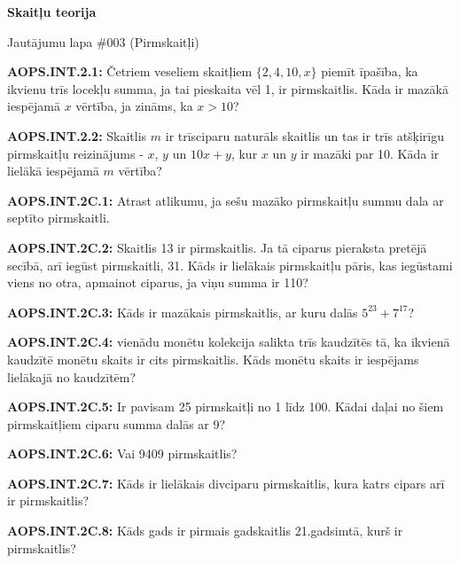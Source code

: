 \documentclass[11pt]{article}
\newenvironment{uzdevums}[1][\unskip]{%
\vspace{3mm}
\noindent
\textbf{#1:}
\noindent}
{}
\begin{document}
\begin{center}
{\LARGE \bf Skaitļu teorija}
\end{center}

\begin{center}
{\large Jautājumu lapa \#003 (Pirmskaitļi)}
\end{center}


\begin{uzdevums}[AOPS.INT.2.1]
Četriem veseliem skaitļiem $\{2,4,10,x\}$ piemīt īpašība, ka ikvienu trīs locekļu summa, ja tai pieskaita vēl 1, ir pirmskaitlis. 
Kāda ir mazākā iespējamā $x$ vērtība, ja zināms, ka $x > 10$?  
\end{uzdevums}





\begin{uzdevums}[AOPS.INT.2.2]
Skaitlis $m$ ir trīsciparu naturāls skaitlis un tas ir trīs atšķirīgu pirmskaitļu reizinājums - $x$, $y$ un $10x+y$, 
kur $x$ un $y$ ir mazāki par 10. Kāda ir lielākā iespējamā $m$ vērtība?
\end{uzdevums}



\begin{uzdevums}[AOPS.INT.2C.1]
Atrast atlikumu, ja sešu mazāko pirmskaitļu summu dala ar septīto pirmskaitli. 
\end{uzdevums}

\begin{uzdevums}[AOPS.INT.2C.2]
Skaitlis 13 ir pirmskaitlis. Ja tā ciparus pieraksta pretējā secībā, arī iegūst pirmskaitli, 31. Kāds ir lielākais pirmskaitļu 
pāris, kas iegūstami viens no otra, apmainot ciparus, ja viņu summa ir 110? 
\end{uzdevums}

\begin{uzdevums}[AOPS.INT.2C.3]
Kāds ir mazākais pirmskaitlis, ar kuru dalās $5^{23} + 7^{17}$?
\end{uzdevums}

\begin{uzdevums}[AOPS.INT.2C.4]
25 vienādu monētu kolekcija salikta trīs kaudzītēs tā, ka ikvienā kaudzītē monētu skaits ir cits pirmskaitlis. Kāds monētu 
skaits ir iespējams lielākajā no kaudzītēm? 
\end{uzdevums}

\begin{uzdevums}[AOPS.INT.2C.5]
Ir pavisam 25 pirmskaitļi no 1 līdz 100. Kādai daļai no šiem pirmskaitļiem ciparu summa dalās ar 9?
\end{uzdevums}

\begin{uzdevums}[AOPS.INT.2C.6]
Vai 9409 pirmskaitlis?
\end{uzdevums}

\begin{uzdevums}[AOPS.INT.2C.7]
Kāds ir lielākais divciparu pirmskaitlis, kura katrs cipars arī ir pirmskaitlis?
\end{uzdevums}

\begin{uzdevums}[AOPS.INT.2C.8]
Kāds gads ir pirmais gadskaitlis 21.gadsimtā, kurš ir pirmskaitlis? 
\end{uzdevums}
\end{document}
